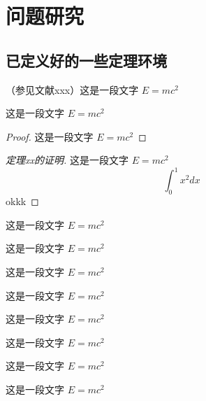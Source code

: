 \chapter{问题研究}


\section{已定义好的一些定理环境}

\begin{definition}[测度]
  （参见文献xxx）这是一段文字 $E = m c^2$
\end{definition}

\begin{theorem}
  这是一段文字 $E = m c^2$
\end{theorem}

\begin{proof}
  这是一段文字 $E = m c^2$
\end{proof}

\begin{proof}[定理xx的证明]
  这是一段文字 $E = m c^2$
  \[
    \int_{0}^{1} x^2 dx
  \]
  okkk
\end{proof}

\begin{example}
  这是一段文字 $E = m c^2$
\end{example}

\begin{property}
  这是一段文字 $E = m c^2$
\end{property}

\begin{proposition}
  这是一段文字 $E = m c^2$
\end{proposition}

\begin{corollary}
  这是一段文字 $E = m c^2$
\end{corollary}

\begin{lemma}
  这是一段文字 $E = m c^2$
\end{lemma}

\begin{axiom}
  这是一段文字 $E = m c^2$
\end{axiom}

\begin{antiexample}
  这是一段文字 $E = m c^2$
\end{antiexample}

\begin{conjecture}
  这是一段文字 $E = m c^2$
\end{conjecture}

